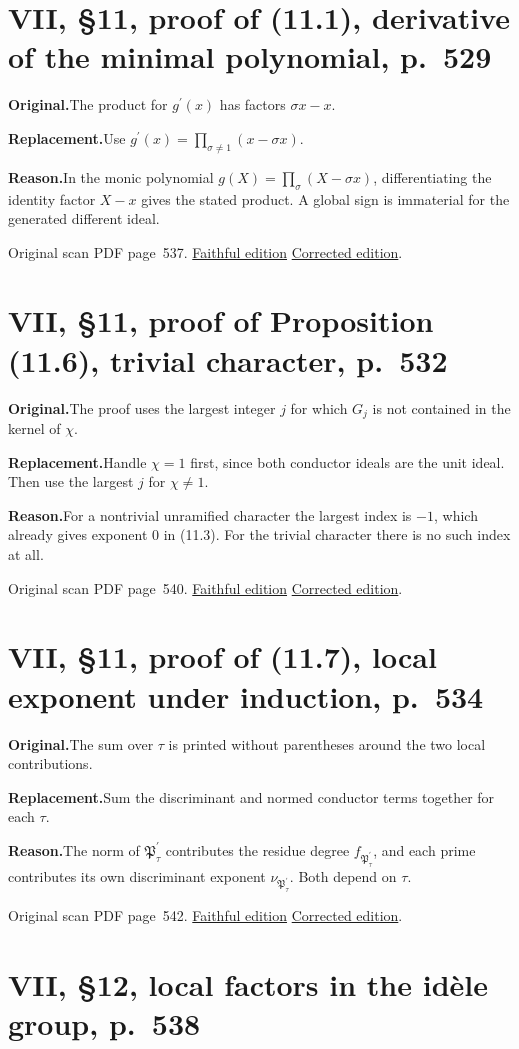 \documentclass[11pt,a4paper]{article}
\newcommand{\original}{\par\smallskip\noindent\textbf{Original.}\enspace}
\newcommand{\replacement}{\par\smallskip\noindent\textbf{Replacement.}\enspace}
\newcommand{\reason}{\par\smallskip\noindent\textbf{Reason.}\enspace}
\newcommand{\editionlink}[3]{\href{#1\#errata.#2}{#3}}
\newcommand{\location}[2]{%
  \par\smallskip\noindent Original scan PDF page~#2.\enspace
  \editionlink{Neukirch_Faithful.pdf}{#1}{Faithful edition}
  \quad\editionlink{Neukirch_Corrected.pdf}{#1}{Corrected edition}.}
\begin{document}
\setcounter{section}{160}
\section{VII, \S11, proof of (11.1), derivative of the minimal polynomial, p.~529}\label{errata:item:161}

\original The product for $g^{\prime}(x)$ has factors $\sigma x-x$.
\replacement Use $g^{\prime}(x)=\prod_{\sigma\ne1}(x-\sigma x)$.
\reason In the monic polynomial $g(X)=\prod_\sigma(X-\sigma x)$, differentiating the identity factor $X-x$ gives the stated product. A global sign is immaterial for the generated different ideal.
\location{161}{537}

\setcounter{section}{161}
\section{VII, \S11, proof of Proposition (11.6), trivial character, p.~532}\label{errata:item:162}

\original The proof uses the largest integer $j$ for which $G_j$ is not contained in the kernel of $\chi$.
\replacement Handle $\chi=1$ first, since both conductor ideals are the unit ideal. Then use the largest $j$ for $\chi\ne1$.
\reason For a nontrivial unramified character the largest index is $-1$, which already gives exponent $0$ in (11.3). For the trivial character there is no such index at all.
\location{162}{540}

\setcounter{section}{162}
\section{VII, \S11, proof of (11.7), local exponent under induction, p.~534}\label{errata:item:163}

\original The sum over $\tau$ is printed without parentheses around the two local contributions.
\replacement Sum the discriminant and normed conductor terms together for each $\tau$.
\reason The norm of $\mathfrak P^{\prime}_\tau$ contributes the residue degree $f_{\mathfrak P^{\prime}_\tau}$, and each prime contributes its own discriminant exponent $\nu_{\mathfrak P^{\prime}_\tau}$. Both depend on $\tau$.
\location{163}{542}

\setcounter{section}{163}
\section{VII, \S12, local factors in the idèle group, p.~538}\label{errata:item:164}
\end{document}
